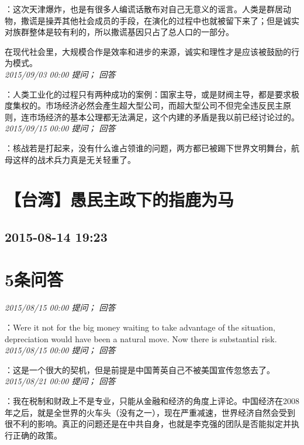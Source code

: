 \documentclass[twocolumn]{ctexart}
\begin{document}
：这次天津爆炸，也是有很多人编谎话散布对自己无意义的谣言。人类是群居动物，撒谎是操弄其他社会成员的手段，在演化的过程中也就被留下来了；但是诚实对族群整体是较有利的，所以撒谎基因只占了总人口的一部分。

在现代社会里，大规模合作是效率和进步的来源，诚实和理性才是应该被鼓励的行为模式。\\

\textit{\hfill\noindent\small 2015/09/03 00:00 提问； 回答}

：人类工业化的过程只有两种成功的案例：国家主导，或是财阀主导，都是要求极度集权的。市场经济必然会產生超大型公司，而超大型公司不但完全违反民主原则，连市场经济的基本公理都无法满足，这个内建的矛盾是我以前已经讨论过的。\\

\textit{\hfill\noindent\small 2015/09/15 00:00 提问； 回答}

：核战若是打起来，没有什么谁占领谁的问题，两方都已被踢下世界文明舞台，航母这样的战术兵力真是无关轻重了。\\


\section{【台湾】愚民主政下的指鹿为马}
\subsection{2015-08-14 19:23}


\section{5条问答}

\textit{\hfill\noindent\small 2015/08/15 00:00 提问； 回答}

：Were it not for the big money waiting to take advantage of the situation, depreciation would have been a natural move. Now there is substantial risk.\\

\textit{\hfill\noindent\small 2015/08/15 00:00 提问； 回答}

：这是一个很大的契机，但是前提是中国菁英自己不被美国宣传忽悠去了。\\

\textit{\hfill\noindent\small 2015/08/21 00:00 提问； 回答}

：我在税制和财政上不是专业，只能从金融和经济的角度上评论。中国经济在2008年之后，就是全世界的火车头（没有之一），现在严重减速，世界经济自然会受到很不利的影响。真正的问题还是在中共自身，也就是李克强的团队是否能拟定并执行正确的政策。
\end{document}
